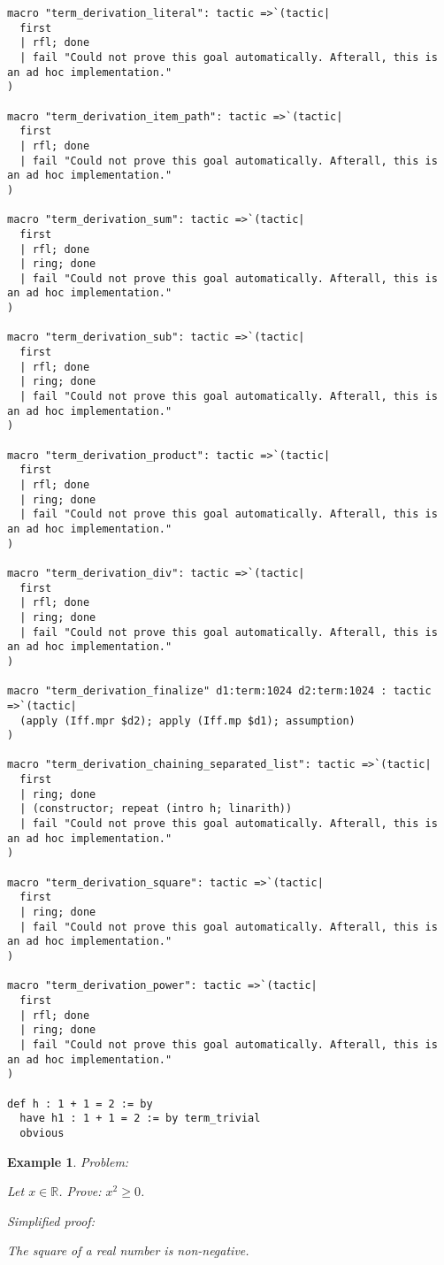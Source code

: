\documentclass{article}
\newtheorem{example}{Example}
\begin{document}
\begin{tcolorbox}[colback=white!10, width=\linewidth]
\begin{lstlisting}[language=Lean4]
macro "term_derivation_literal": tactic =>`(tactic|
  first
  | rfl; done
  | fail "Could not prove this goal automatically. Afterall, this is an ad hoc implementation."
)

macro "term_derivation_item_path": tactic =>`(tactic|
  first
  | rfl; done
  | fail "Could not prove this goal automatically. Afterall, this is an ad hoc implementation."
)

macro "term_derivation_sum": tactic =>`(tactic|
  first
  | rfl; done
  | ring; done
  | fail "Could not prove this goal automatically. Afterall, this is an ad hoc implementation."
)

macro "term_derivation_sub": tactic =>`(tactic|
  first
  | rfl; done
  | ring; done
  | fail "Could not prove this goal automatically. Afterall, this is an ad hoc implementation."
)

macro "term_derivation_product": tactic =>`(tactic|
  first
  | rfl; done
  | ring; done
  | fail "Could not prove this goal automatically. Afterall, this is an ad hoc implementation."
)

macro "term_derivation_div": tactic =>`(tactic|
  first
  | rfl; done
  | ring; done
  | fail "Could not prove this goal automatically. Afterall, this is an ad hoc implementation."
)

macro "term_derivation_finalize" d1:term:1024 d2:term:1024 : tactic =>`(tactic|
  (apply (Iff.mpr $d2); apply (Iff.mp $d1); assumption)
)

macro "term_derivation_chaining_separated_list": tactic =>`(tactic|
  first
  | ring; done
  | (constructor; repeat (intro h; linarith))
  | fail "Could not prove this goal automatically. Afterall, this is an ad hoc implementation."
)

macro "term_derivation_square": tactic =>`(tactic|
  first
  | ring; done
  | fail "Could not prove this goal automatically. Afterall, this is an ad hoc implementation."
)

macro "term_derivation_power": tactic =>`(tactic|
  first
  | rfl; done
  | ring; done
  | fail "Could not prove this goal automatically. Afterall, this is an ad hoc implementation."
)

def h : 1 + 1 = 2 := by
  have h1 : 1 + 1 = 2 := by term_trivial
  obvious

\end{lstlisting}
\end{tcolorbox}


\begin{example}
Problem:
\begin{tcolorbox}[colback=yellow!10, width=\linewidth]
Let $x\in\mathbb{R}$. Prove: $x^2\ge 0$.
\end{tcolorbox}

Simplified proof:
\begin{tcolorbox}[colback=blue!10, width=\linewidth]
The square of a real number is non-negative.
\end{tcolorbox}
\end{example}
\end{document}
